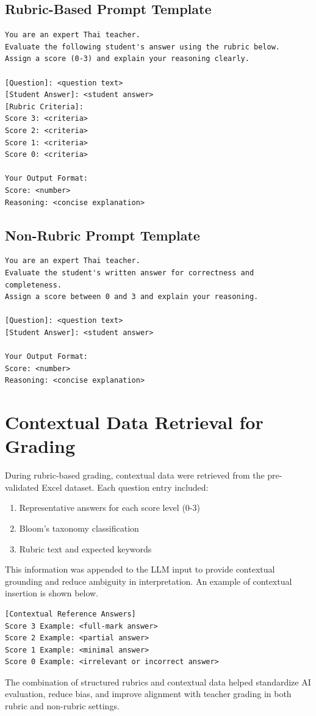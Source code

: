 \subsection*{Rubric-Based Prompt Template}

\begin{verbatim}
You are an expert Thai teacher.
Evaluate the following student's answer using the rubric below.
Assign a score (0-3) and explain your reasoning clearly.

[Question]: <question text>
[Student Answer]: <student answer>
[Rubric Criteria]:
Score 3: <criteria>
Score 2: <criteria>
Score 1: <criteria>
Score 0: <criteria>

Your Output Format:
Score: <number>
Reasoning: <concise explanation>
\end{verbatim}

\subsection*{Non-Rubric Prompt Template}

\begin{verbatim}
You are an expert Thai teacher.
Evaluate the student's written answer for correctness and completeness.
Assign a score between 0 and 3 and explain your reasoning.

[Question]: <question text>
[Student Answer]: <student answer>

Your Output Format:
Score: <number>
Reasoning: <concise explanation>
\end{verbatim}


\section{Contextual Data Retrieval for Grading}

During rubric-based grading, contextual data were retrieved 
from the pre-validated Excel dataset. Each 
question entry included:

\begin{enumerate}
    \item Representative answers for each score level (0-3)
    \item Bloom’s taxonomy classification
    \item Rubric text and expected keywords
\end{enumerate}

This information was appended to the LLM input to provide 
contextual grounding and reduce ambiguity in interpretation.  
An example of contextual insertion is shown below.

\begin{verbatim}
[Contextual Reference Answers]
Score 3 Example: <full-mark answer>
Score 2 Example: <partial answer>
Score 1 Example: <minimal answer>
Score 0 Example: <irrelevant or incorrect answer>
\end{verbatim}

The combination of structured rubrics and contextual data 
helped standardize AI evaluation, reduce bias, and improve 
alignment with teacher grading in both rubric and non-rubric 
settings.
